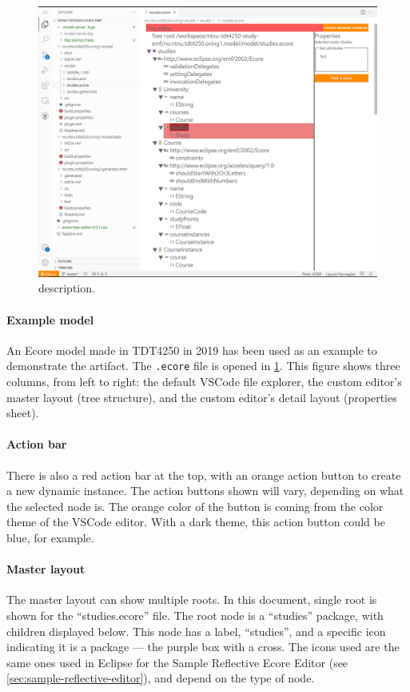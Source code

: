 \begin{figure}[htbp]  %
  \centering
  \includegraphics[width=\textwidth]{figures/gitpod-vscode-ecore-editor-studyemf.png}
  \caption[title]{description.}\label{fig:gitpod-ext-tree-ecore}
\end{figure}

\paragraph{Example model}
An \gls{Ecore} model made in \gls{TDT4250} in 2019 has been used as an example to demonstrate the artifact.
The \texttt{.ecore} file is opened in \cref{fig:gitpod-ext-tree-ecore}.
This figure shows three columns, from left to right: the default \gls{VSCode} file explorer, the custom editor's master layout (tree structure), and the custom editor's detail layout (properties sheet).

\paragraph{Action bar}
There is also a red action bar at the top, with an orange action button to create a new dynamic instance.
The action buttons shown will vary, depending on what the selected node is.
The orange color of the button is coming from the color theme of the \gls{VSCode} editor.
With a dark theme, this action button could be blue, for example.

\paragraph{Master layout}
The master layout can show multiple roots.
In this document,  single root is shown for the ``studies.ecore'' file.
The root node is a ``studies'' package, with children displayed below.
This node has a label, ``studies'', and a specific icon indicating it is a package --- the purple box with a cross.
The icons used are the same ones used in \gls{Eclipse} for the Sample Reflective Ecore Editor (see \cref{sec:sample-reflective-editor}), and depend on the type of node.

